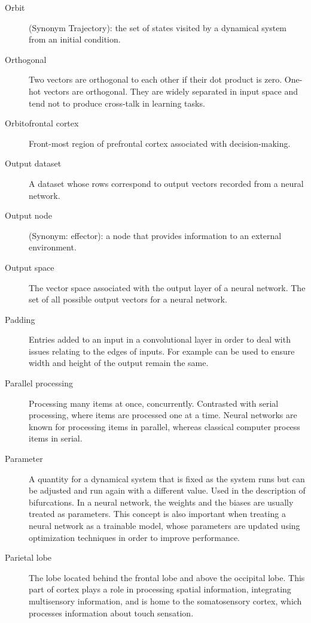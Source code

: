 \begin{description}
\item[Orbit] (Synonym Trajectory): the set of states visited by a dynamical system from an initial condition. 

\item[Orthogonal] Two vectors are orthogonal to each other if their dot product is zero. One-hot vectors are orthogonal. They are widely separated in input space and tend not to produce cross-talk in learning tasks.

\item[Orbitofrontal cortex] Front-most region of prefrontal cortex associated with decision-making.

\item[Output dataset] A dataset whose rows correspond to output vectors recorded from a neural network. 

\item[Output node] (Synonym: effector): a node that provides information to an external environment. 

\item[Output space] The vector space associated with the output layer of a neural network. The set of all possible output vectors for a neural network.

\item[Padding] Entries added to an input in a convolutional layer in order to deal with issues relating to the edges of inputs. For example can be used to ensure width and height of the output remain the same.

\item[Parallel processing] Processing many items at once, concurrently. Contrasted with serial processing, where items are processed one at a time.  Neural networks are known for processing items in parallel, whereas classical computer process items in serial.

\item[Parameter] A quantity for a dynamical system that is fixed as the system runs but can be adjusted and run again with a different value. Used in the description of bifurcations. In a neural network, the weights and the biases are usually treated as parameters. This concept is also important when treating a neural network as a trainable model, whose parameters are updated using optimization techniques in order to improve performance. 

\item[Parietal lobe] The lobe located behind the frontal lobe and above the occipital lobe. This part of cortex plays a role in processing spatial information, integrating multisensory information, and is home to the somatosensory cortex, which processes information about touch sensation.


\end{description}
